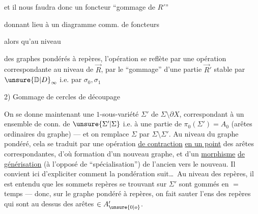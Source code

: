 et  il nous faudra donc  un foncteur ``gommage de $R'$''

 donnant lieu à un diagramme comm. de foncteurs


alors qu'au niveau


des graphes pondérés à repères, l'opération  se reflète par une opération correspondante au niveau de $\vec R$, par le ``gommage'' d'une partie $\vec R'$ stable par ${\unsure{\mathbb D|D}}_\infty$ i.e. par $\sigma_0,\sigma_1$

2) Gommage de cercles de découpage

On se donne maintenant une  $1$-sous-variété  $\Sigma'$ de $\Sigma\setminus\partial X$, correspondant à un ensemble  de  conn. de $\unsure{\Sigma'|\Sigma}$ i.e. à une partie  de $\pi_0(\Sigma')=A_0$ (arêtes ordinaires du graphe) --- et on remplace $\Sigma$ par $\Sigma\setminus\Sigma'$. Au niveau du graphe pondéré, cela se traduit par une opération \uline{de contraction} \uline{en un point} des arêtes correspondantes, d'où formation d'un nouveau graphe, et d'un \uline{morphisme} \uline{de générisation} (à l'opposé de ``spécialisation'') de l'ancien vers le nouveau. Il convient ici d'expliciter comment la pondération suit\ldots\ Au niveau des repères, il est entendu que les sommets repères se trouvant sur $\Sigma'$ sont gommés en $=$ temps --- donc, sur le graphe pondéré à repères, on fait sauter l'ens des repères qui sont au dessus des arêtes $\in A_{\unsure{0|o}}'$.


